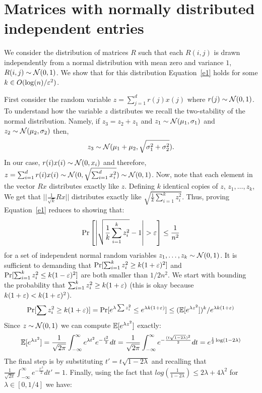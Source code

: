 \documentclass{article}
\begin{document}
\section{Matrices with normally distributed independent entries}
We consider the distribution of matrices $R$ such that each $R(i,j)$ is drawn independently from  a
normal distribution with mean zero and variance $1$, $R(i,j) \sim {\mathcal{N}}(0,1)$. We show that for this
distribution Equation~\ref{e1} holds for some $k \in O(\log(n)/\varepsilon^2)$.

First consider the random variable $z = \sum_{j=1}^{d}r(j)x(j)$ where $r(j) \sim {\mathcal{N}}(0,1)$. 
To understand how the variable $z$ distributes we recall the two-stability of the
normal distribution. Namely, if $z_3 = z_2 + z_1$ and 
$z_1 \sim {\mathcal{N}}(\mu_1,\sigma_{1})$ and $z_2 \sim {\mathcal{N}}(\mu_2,\sigma_{2})$ then, $$z_3 \sim {\mathcal{N}}(\mu_1 + \mu_2,\sqrt{\sigma^{2}_{1} + \sigma^{2}_{2}}).$$
In our case,  $r(i)x(i) \sim {\mathcal{N}}(0,x_{i})$ and therefore, $z = \sum_{i=1}^{d}r(i)x(i) \sim {\mathcal{N}}(0,\sqrt{\sum_{i=1}^{d}x^{2}_{i}}) \sim {\mathcal{N}}(0,1)$.
%
Now, note that each element in the vector $Rx$ distributes exactly like $z$.
Defining $k$ identical copies of $z$, $z_1,\ldots,z_k$,
We get that $||\frac{1}{\sqrt{k}}Rx||$ distributes exactly like $\sqrt{\frac{1}{k}\sum_{i=1}^{k} z^{2}_{i}}$.
Thus, proving Equation~\ref{e1} reduces to showing that:
\begin{equation}
\Pr\left[ \left| \sqrt{\frac{1}{k}\sum_{i=1}^{k} z^{2}_{i}} - 1 \right| > \varepsilon \right] \le \frac{1}{n^2} 
\end{equation}
for a set of independent normal random variables $z_1,\ldots,z_k \sim {\mathcal{N}}(0,1)$.
It is sufficient to demanding that $\Pr[\sum_{i=1}^{k} z^{2}_{i} \ge k(1+\varepsilon)^2]$ and $\Pr[\sum_{i=1}^{k} z^{2}_{i} \le k(1-\varepsilon)^2]$ are both smaller than $1/2n^2$.
We start with bounding the probability that $\sum_{i=1}^{k} z^{2}_{i} \ge k(1+\varepsilon)$ (this is okay because $k(1+\varepsilon) < k(1+\varepsilon)^2$).
\[
\Pr[\sum z^{2}_{i} \ge k(1+\varepsilon)] = \Pr[e^{\lambda \sum z^{2}_{i}} \le e^{\lambda k (1+\varepsilon)}] \le ({\mathbb E}[e^{\lambda z^2}])^k/e^{\lambda k (1+\varepsilon)}
\]
Since $z \sim {\mathcal{N}}(0,1)$ we can compute ${\mathbb E}[e^{\lambda z^2}]$ exactly:
\[
{\mathbb E} [e^{\lambda z^{2}}] = \frac{1}{\sqrt{2\pi}}\int_{-\infty}^{\infty} e^{\lambda t^{2}} e^{-\frac{t^{2}}{2}} dt =\frac{1}{\sqrt{2\pi}}\int_{-\infty}^{\infty} e^{-\frac{(t\sqrt{1-2\lambda})^{2}}{2}}dt = e^{\frac{1}{2} \log(1-2\lambda)}
\]
The final step is by substituting $t' = t\sqrt{1-2\lambda}$ and recalling that $\frac{1}{\sqrt{2\pi}}\int_{-\infty}^{\infty} e^{-\frac{t'^{2}}{2}}dt' = 1$.
Finally, using the fact that $log(\frac{1}{1-2\lambda}) \le 2\lambda + 4\lambda^2$ for $\lambda \in [0,1/4]$ we have:
\end{document}
